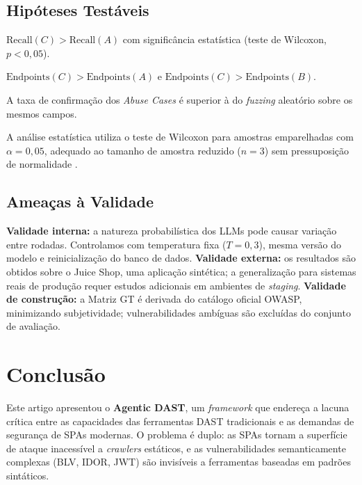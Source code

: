 \documentclass[
    10pt,
    twocolumn,
    a4paper
]{article}
\begin{document}
\subsection{Hipóteses Testáveis}

\begin{description}\setlength{\itemsep}{2pt}
  \item[\textbf{H1}] $\text{Recall}(C) > \text{Recall}(A)$ com
  significância estatística (teste de Wilcoxon, $p < 0{,}05$).
  \item[\textbf{H2}] $\text{Endpoints}(C) > \text{Endpoints}(A)$ e
  $\text{Endpoints}(C) > \text{Endpoints}(B)$.
  \item[\textbf{H3}] A taxa de confirmação dos \textit{Abuse Cases}
  é superior à do \textit{fuzzing} aleatório sobre os mesmos campos.
\end{description}

A análise estatística utiliza o teste de Wilcoxon para amostras
emparelhadas com $\alpha = 0{,}05$, adequado ao tamanho de amostra
reduzido ($n = 3$) sem pressuposição de normalidade
\cite{kitchenham2002}.

\subsection{Ameaças à Validade}

\textbf{Validade interna:} a natureza probabilística dos LLMs pode
causar variação entre rodadas. Controlamos com temperatura fixa
($T = 0{,}3$), mesma versão do modelo e reinicialização do banco de
dados. \textbf{Validade externa:} os resultados são obtidos sobre o
Juice Shop, uma aplicação sintética; a generalização para sistemas reais
de produção requer estudos adicionais em ambientes de \textit{staging}.
\textbf{Validade de construção:} a Matriz GT é derivada do catálogo
oficial OWASP, minimizando subjetividade; vulnerabilidades ambíguas são
excluídas do conjunto de avaliação.

\section{Conclusão}
\label{sec:conclusao}

Este artigo apresentou o \textbf{Agentic DAST}, um \textit{framework}
que endereça a lacuna crítica entre as capacidades das ferramentas DAST
tradicionais e as demandas de segurança de SPAs modernas. O problema
é duplo: as SPAs tornam a superfície de ataque inacessível a
\textit{crawlers} estáticos, e as vulnerabilidades semanticamente
complexas (BLV, IDOR, JWT) são invisíveis a ferramentas baseadas em
padrões sintáticos.
\end{document}

